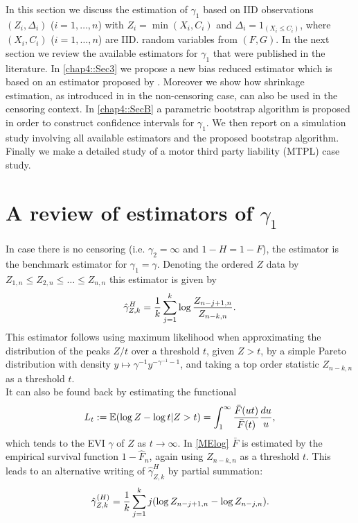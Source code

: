 \vspace{0.3cm}
In this section we discuss the estimation of $\gamma_1$ based on IID observations $(Z_i,\Delta_i)$ ($i=1,\ldots,n$) with $Z_i =\min (X_i,C_i)$ and $\Delta_i=1_{(X_i\leq C_i)}$, where $(X_i,C_i)$ ($i=1,\ldots,n$) are IID. random variables from $(F,G)$. In the next section we review the available estimators for $\gamma_1$ that were published in the literature. In \autoref{chap4::Sec3} we propose a new bias reduced estimator which is based on an estimator proposed by \cite{worms2014new}. Moreover we show how shrinkage estimation, as introduced in \cite{beirlant2017using} in the non-censoring case, can also be used in the censoring context. In \autoref{chap4::SecB} a parametric bootstrap algorithm is proposed in order to construct confidence intervals for $\gamma_1$. We then report on a simulation study involving all available estimators and the proposed bootstrap algorithm. Finally we make a detailed study of a motor third party liability (MTPL) case study.

\section{A review of estimators of $\gamma_1$}
\label{Sec2}

In case there is no censoring (i.e. $\gamma_2 =\infty$ and $1-H=1-F$), the \cite{hill1975simple} estimator is the benchmark estimator for $\gamma_1=\gamma$. Denoting the ordered $Z$ data by $Z_{1,n}\leq Z_{2,n}
\leq \ldots \leq Z_{n,n}$ this estimator is given by
\[
\hat{\gamma}_{Z,k}^H= {1 \over k}\sum_{j=1}^k \log {Z_{n-j+1,n} \over Z_{n-k,n}}.
\]
This estimator follows using maximum likelihood when approximating the distribution of the peaks $Z/t$ over a threshold $t$, given $Z> t$, by a simple Pareto distribution with density $y \mapsto \gamma^{-1} y^{-\gamma^{-1}-1}$, and taking a top order statistic $Z_{n-k,n}$ as a threshold $t$. \\
It can also be found back by estimating the functional
\begin{equation}
L_t := \mathbb{E}(\log Z - \log t|Z>t)= \int_1^{\infty} {\bar{F}(ut) \over \bar{F}(t)} {du \over u}, 
\label{MElog}
\end{equation}
which tends to the EVI $\gamma$ of $Z$ as $t\to \infty$. In \eqref{MElog}
$\bar{F}$ is estimated by the empirical survival function $1-\hat{F}_n$, again using $Z_{n-k,n}$ as a threshold $t$. This leads to an alternative writing of $\hat{\gamma}_{Z,k}^H$ by partial summation:
\[
\hat{\gamma}_{Z,k}^{(H)}= {1 \over k}\sum_{j=1}^k j(\log Z_{n-j+1,n} - \log Z_{n-j,n}).
\]

